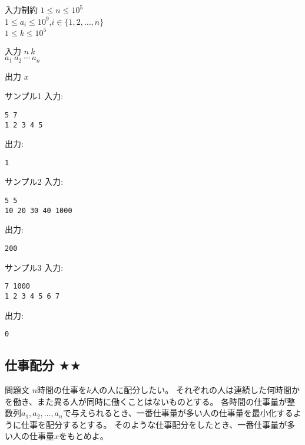 \documentclass[a4paper,twoside,onecolumn,openany,article,10pt]{memoir}
\theoremstyle{remark}
\begin{document}
\begin{itembox}[l]{入力制約}
$1\le n\le 10^5$\\
$1\le a_i\le 10^9$,\hspace{2em}$i\in\{1,2,\dotsc,n\}$\\
$1\le k\le 10^5$
\end{itembox}

\begin{itembox}[l]{入力}
$n~k$\\
$a_1~a_2~\dotsb~a_n$
\end{itembox}

\begin{itembox}[l]{出力}
$x$
\end{itembox}

\begin{itembox}[l]{サンプル1}
入力:
\begin{verbatim}
5 7
1 2 3 4 5
\end{verbatim}
出力:
\begin{verbatim}
1
\end{verbatim}
\end{itembox}

\begin{itembox}[l]{サンプル2}
入力:
\begin{verbatim}
5 5
10 20 30 40 1000
\end{verbatim}
出力:
\begin{verbatim}
200
\end{verbatim}
\end{itembox}

\begin{itembox}[l]{サンプル3}
入力:
\begin{verbatim}
7 1000
1 2 3 4 5 6 7
\end{verbatim}
出力:
\begin{verbatim}
0
\end{verbatim}
\end{itembox}



\clearpage
\subsection{仕事配分 $\bigstar\bigstar$}
\begin{itembox}[l]{問題文}
$n$時間の仕事を$k$人の人に配分したい。
それぞれの人は連続した何時間かを働き、また異る人が同時に働くことはないものとする。
各時間の仕事量が整数列$a_1,a_2,\dotsc,a_n$で与えられるとき、一番仕事量が多い人の仕事量を最小化するように仕事を配分するとする。
そのような仕事配分をしたとき、一番仕事量が多い人の仕事量$x$をもとめよ。
\end{itembox}
\end{document}
